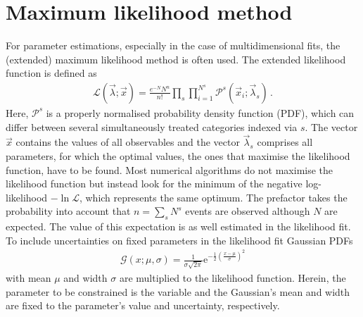 
\section{Maximum likelihood method}
\label{sec:dataanalysis:maximumlikelihood}

For parameter estimations, especially in the case of multidimensional fits,
the (extended) maximum likelihood method is often used. The extended
likelihood function is defined as
\begin{align}
	\label{eq:likelihood}
	\mathcal{L}(\vec{\lambda};\vec{x}) = \frac{e^{-N} N^n}{n!} \prod_{s} \prod_{i=1}^{N^s} \mathcal{P}^s(\vec{x}_i; \vec{\lambda}_s) \, .
\end{align}
Here, $\mathcal{P}^s$ is a properly normalised probability density function
(PDF), which can differ between several simultaneously treated categories
indexed via $s$. The vector $\vec{x}$ contains the values of all observables
and the vector $\vec{\lambda}_s$ comprises all parameters, for which the
optimal values, \ie the ones that maximise the likelihood function, have to be
found. Most numerical algorithms do not maximise the likelihood function but
instead look for the minimum of the negative log-likelihood $-\ln\mathcal{L}$,
which represents the same optimum. The prefactor takes the probability into
account that $n = \sum_s N^s$ events are observed although $N$ are expected.
The value of this expectation is as well estimated in the likelihood fit. To
include uncertainties on fixed parameters in the likelihood fit Gaussian PDFs
%
\begin{align}
\label{eq:dataanalysis:maximumlikelihood:constraint}
\mathcal{G}(x;\mu,\sigma) = \frac{1}{\sigma \sqrt{2 \pi}}\mathrm{e}^{-\frac{1}{2}\left(\frac{x-\mu}{\sigma}\right)^2}
\end{align}
%
with mean $\mu$ and width $\sigma$ are multiplied to the likelihood function.
Herein, the parameter to be constrained is the variable and the Gaussian's
mean and width are fixed to the parameter's value and uncertainty,
respectively.